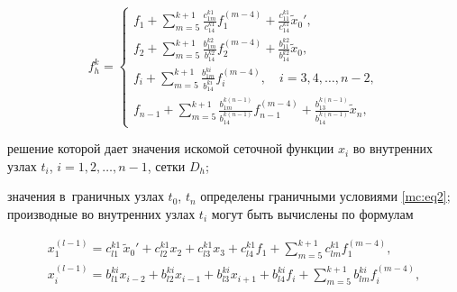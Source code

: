 \begin{equation}

\label{mc:eq24}

   f_{h}^k=

\begin{cases}

\displaystyle

f_{1}+\sum_{m=5}^{k+1}\frac{c_{1m}^{k1}}{c_{14}^{k1}} f_1^{(m-4)}+

\frac{c_{11}^{k1}}{c_{14}^{k1}} \widetilde{x}_0',

\\[3mm]

\displaystyle f_{2}+\sum_{m=5}^{k+1}\frac{b_{1m}^{k2}}{b_{14}^{k2}} f_2^{(m-4)}+

\frac{b_{11}^{k2}}{b_{14}^{k2}} \widetilde{x}_0,

\\[3mm]

\displaystyle

f_{i}+\sum_{m=5}^{k+1}\frac{b_{1m}^{ki}}{b_{14}^{ki}} f_i^{(m-4)},\quad  i=3,  4,  \dots,  n-2,

\\[3mm]

\displaystyle

f_{n-1}+\sum_{m=5}^{k+1}\frac{b_{1m}^{k(n-1)}}{b_{14}^{k(n-1)}} f_{n-1}^{(m-4)}+

\frac{b_{13}^{k(n-1)}}{b_{14}^{k(n-1)}} \widetilde{x}_n,

\end{cases}

\end{equation}

решение которой дает значения искомой сеточной функции $x_i$ во внутренних узлах $   t_i$, $   i=1,  2,  \dots,  n-1$, сетки $   D_h$; 

значения в~граничных узлах  $   t_0$, $t_n$ определены граничными условиями \eqref{mc:eq2}; производные во внутренних узлах $   t_i$ могут быть вычислены по формулам

\begin{gather}

\label{mc:eq24A}

  x_1^{(l-1)}=c_{l1}^{k1}\,\widetilde{x}_0'+c_{l2}^{k1} x_{2}+c_{l3}^{k1} x_{3}+c_{l4}^{k1} f_{1}

+\sum_{m=5}^{k+1}c_{lm}^{k1} f_1^{(m-4)},

\\

\label{mc:eq24B}

  x_i^{(l-1)}=b_{l1}^{ki} x_{i-2}+b_{l2}^{ki} x_{i-1}+b_{l3}^{ki} x_{i+1}+b_{l4}^{ki} f_{i}

+\sum_{m=5}^{k+1}b_{lm}^{ki} f_i^{(m-4)},

\end{gather}

